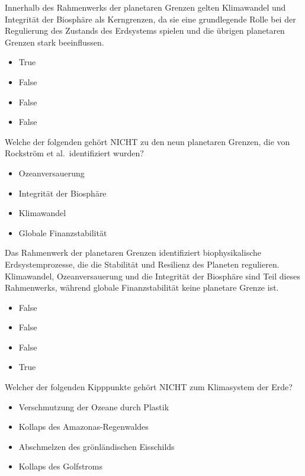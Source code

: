 \documentclass[
  nswissgerman,
  a4paper,
  DIV=11,
  numbers=noendperiod,
  oneside,
  openany]{scrreprt}
\providecommand{\tightlist}{%
  \setlength{\itemsep}{0pt}\setlength{\parskip}{0pt}}
\begin{document}
Innerhalb des Rahmenwerks der planetaren Grenzen gelten Klimawandel und
Integrität der Biosphäre als Kerngrenzen, da sie eine grundlegende Rolle
bei der Regulierung des Zustands des Erdsystems spielen und die übrigen
planetaren Grenzen stark beeinflussen.

\begin{itemize}
\tightlist
\item
  True
\item
  False
\item
  False
\item
  False
\end{itemize}

Welche der folgenden gehört NICHT zu den neun planetaren Grenzen, die
von Rockström et al.~identifiziert wurden?

\begin{itemize}
\tightlist
\item[$\square$]
  Ozeanversauerung
\item[$\square$]
  Integrität der Biosphäre
\item[$\square$]
  Klimawandel
\item[$\square$]
  Globale Finanzstabilität
\end{itemize}

Das Rahmenwerk der planetaren Grenzen identifiziert biophysikalische
Erdsystemprozesse, die die Stabilität und Resilienz des Planeten
regulieren. Klimawandel, Ozeanversauerung und die Integrität der
Biosphäre sind Teil dieses Rahmenwerks, während globale Finanzstabilität
keine planetare Grenze ist.

\begin{itemize}
\tightlist
\item
  False
\item
  False
\item
  False
\item
  True
\end{itemize}

Welcher der folgenden Kipppunkte gehört NICHT zum Klimasystem der Erde?

\begin{itemize}
\tightlist
\item[$\square$]
  Verschmutzung der Ozeane durch Plastik
\item[$\square$]
  Kollaps des Amazonas-Regenwaldes
\item[$\square$]
  Abschmelzen des grönländischen Eisschilds
\item[$\square$]
  Kollaps des Golfstroms
\end{itemize}
\end{document}
